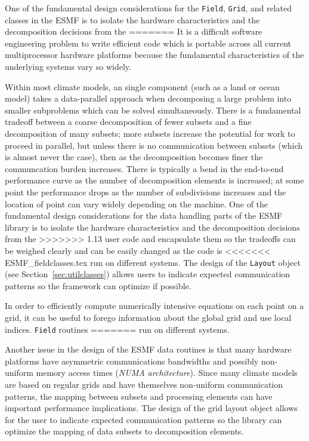 One of the fundamental design considerations for the {\tt Field},
{\tt Grid}, and related classes in the ESMF is to isolate 
the hardware characteristics and the decomposition decisions from the
=======
It is a difficult software engineering problem
to write efficient code which is portable across
all current multiprocessor hardware platforms
because the fundamental characteristics of the underlying
systems vary so widely.

Within most climate models, an single component (such as a
land or ocean model) takes a data-parallel approach when 
decomposing a large problem into smaller subproblems which can be 
solved simultaneously.
There is a fundamental tradeoff between a coarse decomposition
of fewer subsets and a fine decomposition of many subsets;
more subsets increase the potential for
work to proceed in parallel, but unless there is 
no communication between subsets (which is
almost never the case), then as the
decomposition becomes finer the communcation burden increases.
There is typically a bend in the end-to-end performance
curve as the number of decomposition elements is increased;
at some point the performance drops as the number of subdivisions
increases and the location of point can vary widely 
depending on the machine.
One of the fundamental design considerations for the data
handling parts of the ESMF library is to isolate the hardware
characteristics and the decomposition decisions from the
>>>>>>> 1.13
user code and encapsulate them so the tradeoffs can be 
weighed clearly and can be easily changed as the code is 
<<<<<<< ESMF_fieldclasses.tex
run on different systems.  The design of the {\tt Layout} object
(see Section~\ref{sec:utilclasses}) allows users to indicate 
expected communication patterns so the framework can optimize if possible.

In order to efficiently compute numerically intensive equations on 
each point on a grid, it can be useful to forego information about 
the global grid and use local indices.  {\tt Field} routines
=======
run on different systems.

Another issue in the design of the ESMF data routines is that
many hardware platforms have asymmetric
communications bandwidths and possibly non-uniform memory
access times ({\it NUMA architecture}).
Since many climate models are based on regular grids and
have themselves non-uniform communication patterns, the
mapping between subsets and processing elements can have
important performance implications.  The design of the
grid layout object allows for the user to indicate expected
communication patterns so the library can optimize the
mapping of data subsets to decomposition elements.

